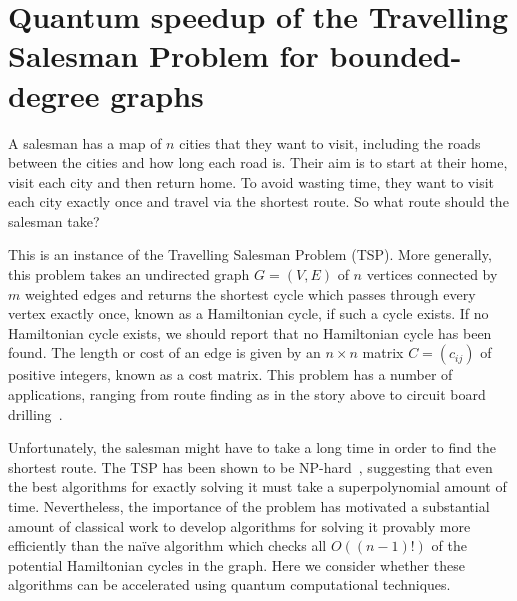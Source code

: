 \chapter{Quantum speedup of the Travelling Salesman Problem for bounded-degree graphs}
\label{chp:tsp}

A salesman has a map of $n$ cities that they want to visit, including the roads between the cities and how long each road is. Their aim is to start at their home, visit each city and then return home. To avoid wasting time, they want to visit each city exactly once and travel via the shortest route. So what route should the salesman take?

This is an instance of the Travelling Salesman Problem (TSP). More generally, this problem takes an undirected graph $G = (V, E)$ of $n$ vertices connected by $m$ weighted edges and returns the shortest cycle which passes through every vertex exactly once, known as a Hamiltonian cycle, if such a cycle exists. If no Hamiltonian cycle exists, we should report that no Hamiltonian cycle has been found. The length or cost of an edge is given by an $n \times n$ matrix $C = (c_{ij})$ of positive integers, known as a cost matrix. This problem has a number of applications, ranging from route finding as in the story above to circuit board drilling~\cite{grotschel1991}.

Unfortunately, the salesman might have to take a long time in order to find the shortest route. The TSP has been shown to be NP-hard~\cite[Chapter $3$]{lawler1985}, suggesting that even the best algorithms for exactly solving it must take a superpolynomial amount of time. Nevertheless, the importance of the problem has motivated a substantial amount of classical work to develop algorithms for solving it provably more efficiently than the na\"ive algorithm which checks all $O((n-1)!)$ of the potential Hamiltonian cycles in the graph. Here we consider whether these algorithms can be accelerated using quantum computational techniques.

